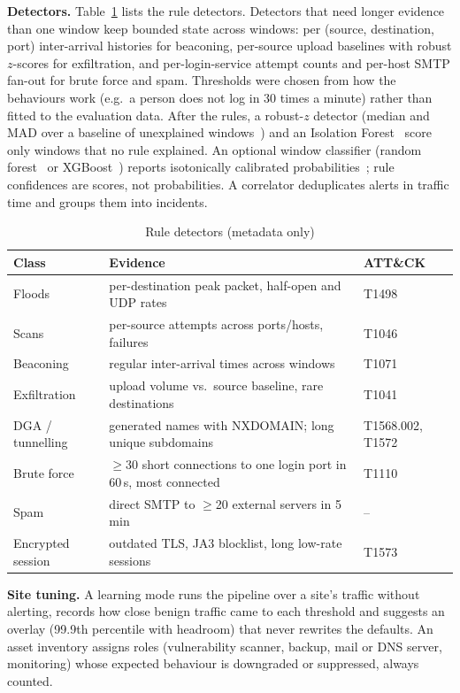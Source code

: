 \documentclass[conference]{IEEEtran}
\begin{document}
\textbf{Detectors.} Table~\ref{tab:detectors} lists the rule detectors. Detectors that need longer evidence than one window keep bounded state across windows: per (source, destination, port) inter-arrival histories for beaconing, per-source upload baselines with robust $z$-scores for exfiltration, and per-login-service attempt counts and per-host SMTP fan-out for brute force and spam. Thresholds were chosen from how the behaviours work (e.g.\ a person does not log in 30 times a minute) rather than fitted to the evaluation data. After the rules, a robust-$z$ detector (median and MAD over a baseline of unexplained windows~\cite{leys2013mad}) and an Isolation Forest~\cite{liu2008isolation} score only windows that no rule explained. An optional window classifier (random forest~\cite{breiman2001rf} or XGBoost~\cite{chen2016xgboost}) reports isotonically calibrated probabilities~\cite{zadrozny2002calibration}; rule confidences are scores, not probabilities. A correlator deduplicates alerts in traffic time and groups them into incidents.

\begin{table}[t]
\caption{Rule detectors (metadata only)}\label{tab:detectors}
\centering\footnotesize
\begin{tabular}{@{}p{2.1cm}p{4.3cm}p{1.1cm}@{}}
\toprule
Class & Evidence & ATT\&CK \\
\midrule
Floods & per-destination peak packet, half-open and UDP rates & T1498 \\
Scans & per-source attempts across ports/hosts, failures & T1046 \\
Beaconing & regular inter-arrival times across windows & T1071 \\
Exfiltration & upload volume vs.\ source baseline, rare destinations & T1041 \\
DGA / tunnelling & generated names with NXDOMAIN; long unique subdomains & T1568.002, T1572 \\
Brute force & $\geq$30 short connections to one login port in 60\,s, most connected & T1110 \\
Spam & direct SMTP to $\geq$20 external servers in 5\,min & -- \\
Encrypted session & outdated TLS, JA3 blocklist, long low-rate sessions & T1573 \\
\bottomrule
\end{tabular}
\end{table}

\textbf{Site tuning.} A learning mode runs the pipeline over a site's traffic without alerting, records how close benign traffic came to each threshold and suggests an overlay (99.9th percentile with headroom) that never rewrites the defaults. An asset inventory assigns roles (vulnerability scanner, backup, mail or DNS server, monitoring) whose expected behaviour is downgraded or suppressed, always counted.
\end{document}

